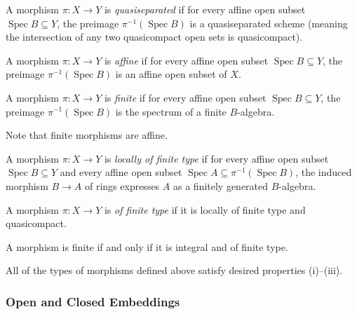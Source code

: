 \documentclass[11pt,openany]{book} %
\newcommand{\spc}{\operatorname{Spec}}
\begin{document}
\begin{definition}
A morphism $\pi : X \to Y$ is \emph{quasiseparated} if for every affine open subset $\spc B \subseteq Y$, the preimage $\pi^{-1}(\spc B)$ is a quasiseparated scheme (meaning the intersection of any two quasicompact open sets is quasicompact).
\end{definition}

\begin{definition}
A morphism $\pi : X \to Y$ is \emph{affine} if for every affine open subset $\spc B \subseteq Y$, the preimage $\pi^{-1}(\spc B)$ is an affine open subset of $X$.
\end{definition}

\begin{definition}
A morphism $\pi : X \to Y$ is \emph{finite} if for every affine open subset $\spc B \subseteq Y$, the preimage $\pi^{-1}(\spc B)$ is the spectrum of a finite $B$-algebra.
\end{definition}

Note that finite morphisms are affine.

\begin{definition}
A morphism $\pi : X \to Y$ is \emph{locally of finite type} if for every affine open subset $\spc B \subseteq Y$ and every affine open subset $\spc A \subseteq \pi^{-1}(\spc B)$, the induced morphism $B \to A$ of rings expresses $A$ as a finitely generated $B$-algebra.
\end{definition}

\begin{definition}
A morphism $\pi : X \to Y$ is \emph{of finite type} if it is locally of finite type and quasicompact.
\end{definition}

\begin{proposition}
A morphism is finite if and only if it is integral and of finite type.
\end{proposition}

\begin{proposition}
All of the types of morphisms defined above satisfy desired properties (i)--(iii).
\end{proposition}


\subsubsection{Open and Closed Embeddings}
\end{document}
